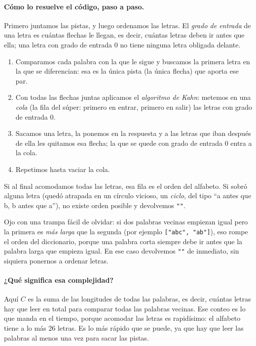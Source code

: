 \paragraph{Cómo lo resuelve el código, paso a paso.} Primero juntamos las
pistas, y luego ordenamos las letras. El \emph{grado de entrada} de una letra es
cuántas flechas le llegan, es decir, cuántas letras deben ir antes que ella; una
letra con grado de entrada $0$ no tiene ninguna letra obligada delante.
\begin{enumerate}
  \item Comparamos cada palabra con la que le sigue y buscamos la primera letra
        en la que se diferencian: esa es la única pista (la única flecha) que
        aporta ese par.
  \item Con todas las flechas juntas aplicamos el \emph{algoritmo de Kahn}:
        metemos en una \emph{cola} (la fila del súper: primero en entrar,
        primero en salir) las letras con grado de entrada $0$.
  \item Sacamos una letra, la ponemos en la respuesta y a las letras que iban
        después de ella les quitamos esa flecha; la que se quede con grado de
        entrada $0$ entra a la cola.
  \item Repetimos hasta vaciar la cola.
\end{enumerate}
Si al final acomodamos todas las letras, esa fila es el orden del alfabeto. Si
sobró alguna letra (quedó atrapada en un círculo vicioso, un \emph{ciclo}, del
tipo ``a antes que b, b antes que a''), no existe orden posible y devolvemos
\texttt{""}.

Ojo con una trampa fácil de olvidar: si dos palabras vecinas empiezan igual pero
la primera es \emph{más larga} que la segunda (por ejemplo
\texttt{["abc", "ab"]}), eso rompe el orden del diccionario, porque una palabra
corta siempre debe ir antes que la palabra larga que empieza igual. En ese caso
devolvemos \texttt{""} de inmediato, sin siquiera ponernos a ordenar letras.




\paragraph{¿Qué significa esa complejidad?} Aquí $C$ es la suma de las
longitudes de todas las palabras, es decir, cuántas letras hay que leer en total
para comparar todas las palabras vecinas. Ese conteo es lo que manda en el
tiempo, porque acomodar las letras es rapidísimo: el alfabeto tiene a lo más
$26$ letras. Es lo más rápido que se puede, ya que hay que leer las palabras al
menos una vez para sacar las pistas.

